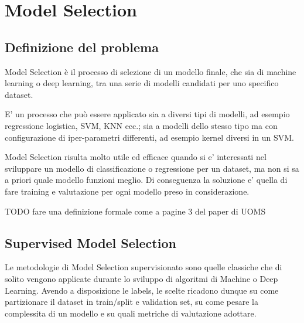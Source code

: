\chapter{Model Selection}

\section{Definizione del problema}
Model Selection è il processo di selezione di un modello finale, che sia di machine learning o deep learning, tra una serie di modelli candidati per uno specifico dataset.

E' un processo che può essere applicato sia a diversi tipi di modelli, ad esempio regressione logistica, SVM, KNN ecc.; sia a modelli dello stesso tipo ma con configurazione di iper-parametri differenti, ad esempio kernel diversi in un SVM.

Model Selection risulta molto utile ed efficace quando si e' interessati nel sviluppare un modello di classificazione o regressione per un dataset, ma non si sa a priori quale modello funzioni meglio. Di conseguenza la soluzione e' quella di fare training e valutazione per ogni modello preso in considerazione.

TODO fare una definizione formale come a pagine 3 del paper di UOMS

\section{Supervised Model Selection}
Le metodologie di Model Selection supervisionato sono quelle classiche che di solito vengono applicate durante lo sviluppo di algoritmi di Machine o Deep Learning. Avendo a disposizione le labels, le scelte ricadono dunque su come partizionare il dataset in train/split e validation set, su come pesare la complessita di un modello e su quali metriche di valutazione adottare.

